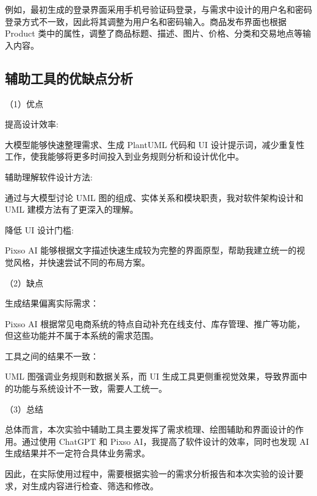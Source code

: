 \documentclass[12pt,a4paper]{article}
\begin{document}
	例如，最初生成的登录界面采用手机号验证码登录，与需求中设计的用户名和密码登录方式不一致，因此将其调整为用户名和密码输入。商品发布界面也根据 Product 类中的属性，调整了商品标题、描述、图片、价格、分类和交易地点等输入内容。
	
	\subsection{辅助工具的优缺点分析}
	
	（1）优点
	
	提高设计效率:
	
	大模型能够快速整理需求、生成 PlantUML 代码和 UI 设计提示词，减少重复性工作，使我能够将更多时间投入到业务规则分析和设计优化中。
	
	辅助理解软件设计方法:
	
	通过与大模型讨论 UML 图的组成、实体关系和模块职责，我对软件架构设计和 UML 建模方法有了更深入的理解。
	
	降低 UI 设计门槛:
	
	Pixso AI 能够根据文字描述快速生成较为完整的界面原型，帮助我建立统一的视觉风格，并快速尝试不同的布局方案。
	
	（2）缺点
	
	生成结果偏离实际需求：
	
	Pixso AI 根据常见电商系统的特点自动补充在线支付、库存管理、推广等功能，但这些功能并不属于本系统的需求范围。
	
	工具之间的结果不一致：
	
	UML 图强调业务规则和数据关系，而 UI 生成工具更侧重视觉效果，导致界面中的功能与系统设计不一致，需要人工统一。
	
	（3）总结
	
	总体而言，本次实验中辅助工具主要发挥了需求梳理、绘图辅助和界面设计的作用。通过使用 ChatGPT 和 Pixso AI，我提高了软件设计的效率，同时也发现 AI 生成结果并不一定符合具体业务需求。
	
	因此，在实际使用过程中，需要根据实验一的需求分析报告和本次实验的设计要求，对生成内容进行检查、筛选和修改。
	
\end{document}
